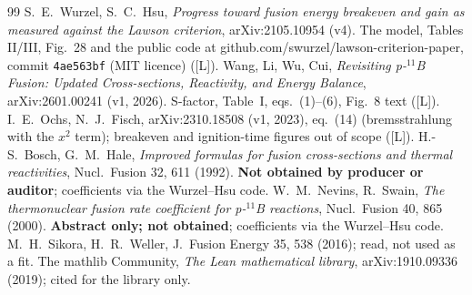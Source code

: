 \documentclass[10pt]{article}
\newcommand{\tier}[1]{\textsf{[#1]}}
\newcommand{\tL}{\tier{L}}
\begin{document}
\begin{thebibliography}{99}\small
{} S.~E.~Wurzel, S.~C.~Hsu, \emph{Progress toward fusion energy breakeven and gain as measured against the Lawson criterion}, arXiv:2105.10954 (v4). The model, Tables II/III, Fig.~28 and the public code at github.com/swurzel/lawson-criterion-paper, commit \texttt{4ae563bf} (MIT licence) (\tL).
 Wang, Li, Wu, Cui, \emph{Revisiting p-$^{11}$B Fusion: Updated Cross-sections, Reactivity, and Energy Balance}, arXiv:2601.00241 (v1, 2026). S-factor, Table~I, eqs.~(1)--(6), Fig.~8 text (\tL).
 I.~E.~Ochs, N.~J.~Fisch, arXiv:2310.18508 (v1, 2023), eq.~(14) (bremsstrahlung with the $x^2$ term); breakeven and ignition-time figures out of scope (\tL).
 H.-S.~Bosch, G.~M.~Hale, \emph{Improved formulas for fusion cross-sections and thermal reactivities}, Nucl.\ Fusion 32, 611 (1992). \textbf{Not obtained by producer or auditor}; coefficients via the Wurzel--Hsu code.
 W.~M.~Nevins, R.~Swain, \emph{The thermonuclear fusion rate coefficient for p-$^{11}$B reactions}, Nucl.\ Fusion 40, 865 (2000). \textbf{Abstract only; not obtained}; coefficients via the Wurzel--Hsu code.
 M.~H.~Sikora, H.~R.~Weller, J.\ Fusion Energy 35, 538 (2016); read, not used as a fit.
 The mathlib Community, \emph{The Lean mathematical library}, arXiv:1910.09336 (2019); cited for the library only.
\end{thebibliography}
\end{document}
